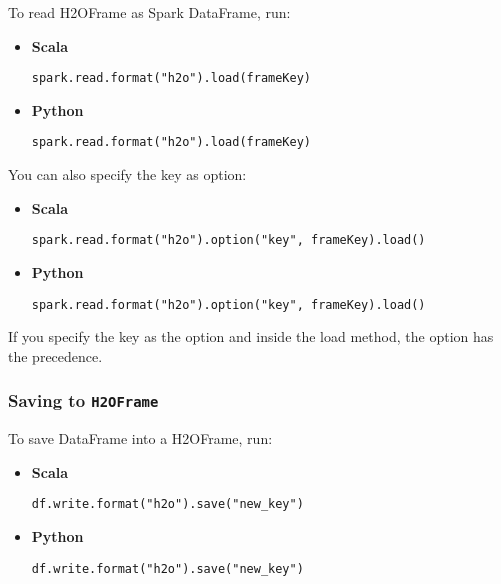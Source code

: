 \documentclass{standalone}
\begin{document}
    To read H2OFrame as Spark DataFrame, run:

    \begin{itemize}
        \item \textbf{Scala} \begin{lstlisting}[style=Scala]
spark.read.format("h2o").load(frameKey)
        \end{lstlisting}
        \item \textbf{Python} \begin{lstlisting}[style=Python]
spark.read.format("h2o").load(frameKey)
        \end{lstlisting}
    \end{itemize}

    You can also specify the key as option:

    \begin{itemize}
        \item \textbf{Scala} \begin{lstlisting}[style=Scala]
spark.read.format("h2o").option("key", frameKey).load()
        \end{lstlisting}
        \item \textbf{Python} \begin{lstlisting}[style=Python]
spark.read.format("h2o").option("key", frameKey).load()
        \end{lstlisting}
    \end{itemize}

    If you specify the key as the option and inside the load method, the option
    has the precedence.

    \subsubsection{Saving to \texttt{H2OFrame}}

    To save DataFrame into a H2OFrame, run:

    \begin{itemize}
        \item \textbf{Scala} \begin{lstlisting}[style=Scala]
df.write.format("h2o").save("new_key")
        \end{lstlisting}
        \item \textbf{Python} \begin{lstlisting}[style=Python]
df.write.format("h2o").save("new_key")
        \end{lstlisting}
    \end{itemize}
\end{document}
